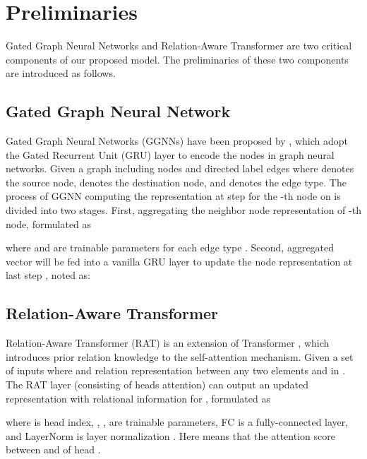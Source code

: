 \documentclass{article}
\begin{document}

 

\clearpage

\appendix
\section{Preliminaries}
Gated Graph Neural Networks \citep{li2015gated} and Relation-Aware Transformer \citep{wang2020rat} are two critical components of our proposed model. 
The preliminaries of these two components are introduced as follows.

\subsection{Gated Graph Neural Network}
\label{app_gated_graph_neural_network}
Gated Graph Neural Networks (GGNNs) have been proposed by \citet{li2015gated}, which adopt the Gated Recurrent Unit (GRU) \citep{cho2014learning} layer to encode the nodes in graph neural networks. Given a graph  including nodes  and directed label edges  where  denotes the source node,  denotes the destination node, and  denotes the edge type. 
The process of GGNN computing the representation  at step  for the -th node on  is divided into two stages. First, aggregating the neighbor node representation  of -th node, formulated as

where  and  are trainable parameters for each edge type . 
Second, aggregated vector  will be fed into a vanilla GRU layer to update the node representation at last step , noted as:


\subsection{Relation-Aware Transformer}
\label{app_relation_aware_transformer}
Relation-Aware Transformer (RAT) \citep{wang2020rat} is an extension of Transformer \citep{vaswani2017attention}, which introduces prior relation knowledge to the self-attention mechanism. Given a set of inputs  where  and   
relation representation   between any two elements  and  in . The RAT layer (consisting of  heads attention) can output an updated representation  with relational information for , formulated as
\begin{small}

\end{small}
where  is head index, , ,  are trainable parameters, FC is a fully-connected layer, and LayerNorm is layer normalization \citep{ba2016layer}.
Here  means that the attention score between  and  of head . 
\end{document}
